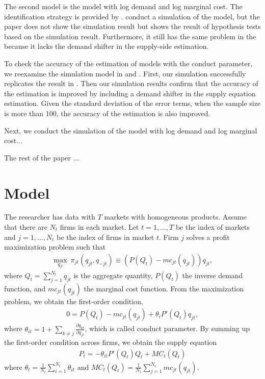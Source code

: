 \documentclass[11pt, a4paper]{article}
\begin{document}
The second model is the model with log demand and log marginal cost.
The identification strategy is provided by \citet{lau1982identifying}.
\cite{hyde1995can} conduct a simulation of the model, but the paper does not show the simulation result but shows the result of hypothesis tests based on the simulation result.
Furthermore, it still has the same problem in the \cite{perloff2012collinearity} because it lacks the demand shifter in the supply-side estimation.




To check the accuracy of the estimation of models with the conduct parameter, we reexamine the simulation model in \cite{perloff2012collinearity} and \cite{perloff2012collinearity}.
First, our simulation successfully replicates the result in \cite{perloff2012collinearity}.
Then our simulation results confirm that the accuracy of the estimation is improved by including a demand shifter in the supply equation estimation.
Given the standard deviation of the error terms, when the sample size is more than 100, the accuracy of the estimation is also improved.

Next, we conduct the simulation of the model with log demand and log marginal cost...


The rest of the paper ...



\section{Model}
The researcher has data with $T$ markets with homogeneous products.
Assume that there are $N_t$ firms in each market.
Let $t = 1,\ldots, T$ be the index of markets and $j = 1, \ldots, N_t$ be the index of firms in market $t$.
Firm $j$ solves a profit maximization problem such that
\begin{align}
    \max_{q_{jt}} \ \pi_{jt}(q_{jt}, q_{-jt}) \equiv (P(Q_t) - mc_{jt}(q_{jt}))q_{jt},
\end{align}
where $Q_t = \sum_{j = 1}^{N_t} q_{jt}$ is the aggregate quantity, $P(Q_t)$ the inverse demand function, and $mc_{jt}(q_{jt})$ the marginal cost function.
From the maximization problem, we obtain the first-order condition,
\begin{align}
    0 = P(Q_{t}) - mc_{jt}(q_{jt}) + \theta_i P'(Q_{t})q_{jt},
\end{align}
where $\theta_{it} = 1 + \sum_{k\ne j}\frac{\partial q_{kt}}{\partial q_{jt}}$, which is called conduct parameter.
By summing up the first-order condition across firms, we obtain the supply equation 
\begin{align}
     P_t = -\theta_{it}P'(Q_{t})Q_t + MC_t(Q_t)
\end{align}
where $\theta_t = \frac{1}{N_t}\sum_{i = 1}^{N_t}\theta_{it}$ and $MC_t(Q_t) = \frac{1}{N_t}\sum_{j = 1}^{N_t} mc_{jt}(q_{jt})$.
\end{document}
